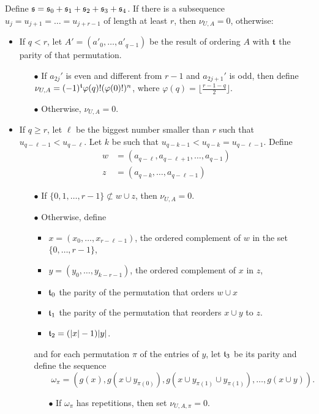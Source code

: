 Define $\mathfrak{s} =\mathfrak{s}_0+\mathfrak{s}_1+\mathfrak{s}_2+\mathfrak{s}_3 + \mathfrak{s}_4$. If there is a subsequence $u_j = u_{j+1} = \ldots = u_{j+r-1}$ of length at least $r$, then $\nu_{U,A}=0$, otherwise:
\begin{itemize}
	\item If $q<r$, let $A' = (a'_0,\ldots,a'_{q-1})$ be the result of ordering $A$ with $\mathfrak{t}$ the parity of that permutation. 
	\begin{itemize}
		\item[$\bullet$] If $a_{2j}'$ is even and different from $r-1$ and $a_{2j+1}'$ is odd, then define $\nu_{U,A} = (-1)^{\mathfrak{t}}\varphi(q)!(\varphi(0)!)^n$, where $\varphi(q) = \lfloor \frac{r-1-q}{2}\rfloor$. 
		\item[$\bullet$] Otherwise, $\nu_{U,A}=0$.
	\end{itemize}
\item  If $q\geq r$, let $\ell$ be the biggest number smaller than $r$ such that $u_{q-\ell-1}<u_{q-\ell}$.  Let $k$ be such that $u_{q-k-1}<u_{q-k} = u_{q-\ell-1}$. Define
\begin{align*}
w &= (a_{q-\ell},a_{q-\ell+1},\ldots,a_{q-1})
\\
z &= (a_{q-k},\ldots,a_{q-\ell-1})
\end{align*}
\begin{itemize}
	\item[$\bullet$] If $\{0,1,\ldots,r-1\}\not\subset w\cup z$, then $\nu_{U,A} = 0$.
	\item[$\bullet$] Otherwise, define 
\begin{itemize}
	\item $x = (x_0,\ldots,x_{r-\ell-1})$, the ordered complement of $w$ in the set $\{0, \ldots ,r-1\}$,
	\item	$y = (y_0,\ldots,y_{k-r-1})$, the ordered complement of $x$ in $z$,
	\item $\mathfrak{t}_0$ the parity of the permutation that orders $w\cup x$
	\item $\mathfrak{t}_1$ the parity of the permutation that reorders $x\cup y$ to $z$.
	\item $\mathfrak{t}_2=(|x|-1)|y|$.
\end{itemize}
and for each permutation $\pi$ of the entries of $y$, let $\mathfrak{t}_3$ be its parity and define the sequence 
\[
\quad\quad \omega_\pi = (g(x),g(x\cup y_{\pi(0)}), g(x \cup y_{\pi(1)}\cup y_{\pi(1)}), \ldots, g(x\cup y)).
\]
\begin{itemize}
	\item[$\bullet$] If $\omega_\pi$ has repetitions, then set $\nu_{U,A,\pi} = 0$.

\end{itemize}
\end{itemize}
\end{itemize}
